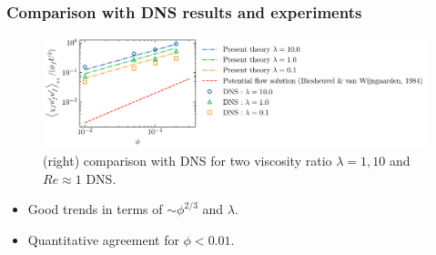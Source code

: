 \documentclass{sintefbeamer}
\begin{document}
\begin{frame}
  \frametitle{Comparison with DNS results and experiments}
  \begin{figure}[h!]
    \centering    
    \includegraphics[height = 0.20\textwidth]{image/HOMOGENEOUS_final/CA/UUyy_Ga_5.pdf}
    \caption{
      (right) comparison with DNS for two viscosity ratio $\lambda =1,10$ and $Re \approx 1$ DNS. 
    }
\end{figure}  
\begin{itemize}
  \item Good trends in terms of $\sim \phi^{2/3}$ and $\lambda$.  
  \item Quantitative agreement for $\phi < 0.01$.  
\end{itemize}
\end{frame}
\end{document}
